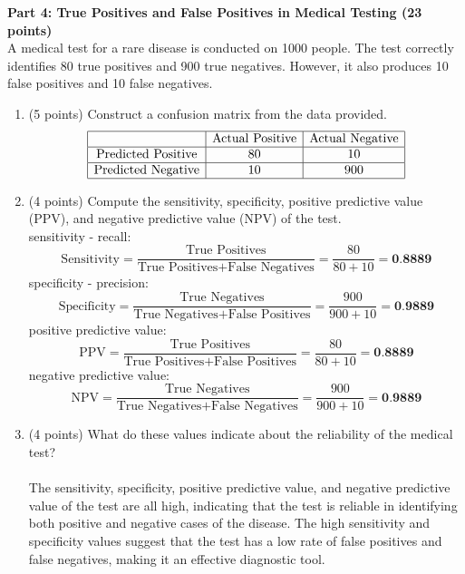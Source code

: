 \documentclass[a3paper,12pt]{extarticle} %
\begin{document}
    \subitem \textbf{Part 4: True Positives and False Positives in Medical Testing (23 points)}
    \\ A medical test for a rare disease is conducted on 1000 people. The test correctly identifies 80 true positives and 900 true negatives. However, it also produces 10 false positives and 10 false negatives.
    \begin{enumerate}
        \item (5 points) Construct a confusion matrix from the data provided.
        \[
        \begin{array}{|c|c|c|}
        \hline
        & \text{Actual Positive} & \text{Actual Negative} \\
        \hline
        \text{Predicted Positive} & 80 & 10 \\
        \hline
        \text{Predicted Negative} & 10 & 900 \\
        \hline
        \end{array}
        \]
        \item (4 points) Compute the sensitivity, specificity, positive predictive value (PPV), and negative
        predictive value (NPV) of the test.
        \\ sensitivity - recall:
        \[
        \text{Sensitivity} = \frac{\text{True Positives}}{\text{True Positives} + \text{False Negatives}} = \frac{80}{80 + 10} = \textbf{0.8889}
        \]
        specificity - precision:
        \[
        \text{Specificity} = \frac{\text{True Negatives}}{\text{True Negatives} + \text{False Positives}} = \frac{900}{900 + 10} = \textbf{0.9889}
        \]
        positive predictive value:
        \[
        \text{PPV} = \frac{\text{True Positives}}{\text{True Positives} + \text{False Positives}} = \frac{80}{80 + 10} = \textbf{0.8889}
        \]
        negative predictive value:
        \[
        \text{NPV} = \frac{\text{True Negatives}}{\text{True Negatives} + \text{False Negatives}} = \frac{900}{900 + 10} = \textbf{0.9889}
        \]
        \item (4 points) What do these values indicate about the reliability of the medical test?
        \\\\ The sensitivity, specificity, positive predictive value, and negative predictive value of the test are all high, indicating that the test is reliable in identifying both positive and negative cases of the disease. The high sensitivity and specificity values suggest that the test has a low rate of false positives and false negatives, making it an effective diagnostic tool.

\end{enumerate}
\end{document}
